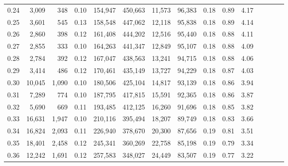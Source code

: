 \begin{tabular}{rrrcrrrrrrrrrrr}
0.24 &   3,009 &    348 &                                       0.10 &  154,947 &  450,663 &   11,573 &   96,383 &  0.18 &  0.89 &                         4.17 \\
0.25 &   3,601 &    545 &                                       0.13 &  158,548 &  447,062 &   12,118 &   95,838 &  0.18 &  0.89 &                         4.14 \\
0.26 &   2,860 &    398 &                                       0.12 &  161,408 &  444,202 &   12,516 &   95,440 &  0.18 &  0.88 &                         4.11 \\
0.27 &   2,855 &    333 &                                       0.10 &  164,263 &  441,347 &   12,849 &   95,107 &  0.18 &  0.88 &                         4.09 \\
0.28 &   2,784 &    392 &                                       0.12 &  167,047 &  438,563 &   13,241 &   94,715 &  0.18 &  0.88 &                         4.06 \\
0.29 &   3,414 &    486 &                                       0.12 &  170,461 &  435,149 &   13,727 &   94,229 &  0.18 &  0.87 &                         4.03 \\
0.30 &  10,045 &  1,090 &                                       0.10 &  180,506 &  425,104 &   14,817 &   93,139 &  0.18 &  0.86 &                         3.94 \\
0.31 &   7,289 &    774 &                                       0.10 &  187,795 &  417,815 &   15,591 &   92,365 &  0.18 &  0.86 &                         3.87 \\
0.32 &   5,690 &    669 &                                       0.11 &  193,485 &  412,125 &   16,260 &   91,696 &  0.18 &  0.85 &                         3.82 \\
0.33 &  16,631 &  1,947 &                                       0.10 &  210,116 &  395,494 &   18,207 &   89,749 &  0.18 &  0.83 &                         3.66 \\
0.34 &  16,824 &  2,093 &                                       0.11 &  226,940 &  378,670 &   20,300 &   87,656 &  0.19 &  0.81 &                         3.51 \\
0.35 &  18,401 &  2,458 &                                       0.12 &  245,341 &  360,269 &   22,758 &   85,198 &  0.19 &  0.79 &                         3.34 \\
0.36 &  12,242 &  1,691 &                                       0.12 &  257,583 &  348,027 &   24,449 &   83,507 &  0.19 &  0.77 &                         3.22 \\

\end{tabular}
